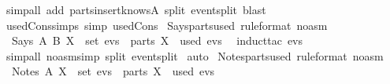 \begin{isabellebody}
  \isamarkupfalse%
  \ {\isacharparenleft}simp{\isacharunderscore}all\ add{\isacharcolon}\ parts{\isacharunderscore}insert{\isacharunderscore}knows{\isacharunderscore}A\ split{\isacharcolon}\ event{\isachardot}split{\isacharcomma}\ blast{\isacharparenright}\isanewline
  \isamarkupfalse%
  \endisatagproof
  {\isafoldproof}%
  \isadelimproof
  \isanewline
  \endisadelimproof
  \isanewline
  \isamarkupfalse%
  \ used{\isacharunderscore}Cons{\isacharunderscore}simps\ {\isacharbrackleft}simp{\isacharbrackright}{\isacharcolon}\ used{\isacharunderscore}Cons%
  \isadelimdocument
  \endisadelimdocument
  \isatagdocument
  \isamarkuptrue%
  \endisatagdocument
  {\isafolddocument}%
  \isadelimdocument
  \endisadelimdocument
  \isamarkupfalse%
  \ Says{\isacharunderscore}parts{\isacharunderscore}used\ {\isacharbrackleft}rule{\isacharunderscore}format\ {\isacharparenleft}no{\isacharunderscore}asm{\isacharparenright}{\isacharbrackright}\ {\isacharcolon}\isanewline
  \ \ {\isachardoublequoteopen}Says\ A\ B\ X\ {\isasymin}\ set\ evs\ {\isasymlongrightarrow}\ {\isacharparenleft}parts\ {\isacharbraceleft}X{\isacharbraceright}{\isacharparenright}\ {\isasymsubseteq}\ used\ evs\ {\isachardoublequoteclose}\isanewline
  \isadelimproof
  \endisadelimproof
  \isatagproof
  \isamarkupfalse%
  \ {\isacharparenleft}induct{\isacharunderscore}tac\ {\isachardoublequoteopen}evs{\isachardoublequoteclose}{\isacharparenright}\isanewline
  \isamarkupfalse%
  \ {\isacharparenleft}simp{\isacharunderscore}all\ {\isacharparenleft}no{\isacharunderscore}asm{\isacharunderscore}simp{\isacharparenright}\ split{\isacharcolon}\ event{\isachardot}split{\isacharparenright}\isanewline
  \isamarkupfalse%
  \ {\isacharparenleft}auto{\isacharparenright}\isanewline
  \isamarkupfalse%
  \endisatagproof
  {\isafoldproof}%
  \isadelimproof
  \isanewline
  \endisadelimproof
  \isanewline
  \isamarkupfalse%
  \ Notes{\isacharunderscore}parts{\isacharunderscore}used\ {\isacharbrackleft}rule{\isacharunderscore}format\ {\isacharparenleft}no{\isacharunderscore}asm{\isacharparenright}{\isacharbrackright}\ {\isacharcolon}\isanewline
  \ \ {\isachardoublequoteopen}Notes\ A\ X\ {\isasymin}\ set\ evs\ {\isasymlongrightarrow}\ {\isacharparenleft}parts\ {\isacharbraceleft}X{\isacharbraceright}{\isacharparenright}\ {\isasymsubseteq}\ used\ evs{\isachardoublequoteclose}\isanewline

\end{isabellebody}
